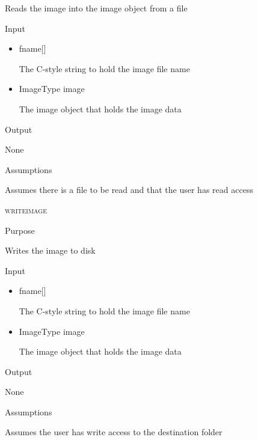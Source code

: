 \documentclass[pdftex, 11pt]{article}
\begin{document}
\begin{description}
\begin{description}
				Reads the image into the image object from a file

			\item{Input}

				\begin{itemize}

					\item{fname[]}

						The C-style string to hold the image 
						file name

					\item{ImageType image}

						The image object that holds the
						image data

				\end{itemize}

			\item{Output}

				None

			\item{Assumptions}

				Assumes there is a file to be read and that the
				user has read access

		\end{description}


	\item{\textsc{writeimage}}
		\begin{description}
			\item{Purpose}

				Writes the image to disk

			\item{Input}

				\begin{itemize}

					\item{fname[]}

						The C-style string to hold the image 
						file name

					\item{ImageType image}

						The image object that holds the
						image data

				\end{itemize}



			\item{Output}

				None

			\item{Assumptions}

				Assumes the user has write access to the
				destination folder

		\end{description}


\end{description}
\end{document}
